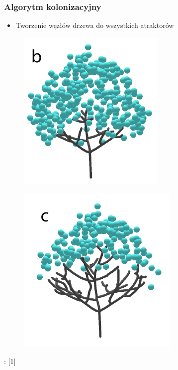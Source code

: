 \documentclass[blue,table]{beamer}
\begin{document}
\begin{frame}\frametitle{Algorytm kolonizacyjny}
\begin{itemize}
\item{Tworzenie węzłów drzewa do wszystkich atraktorów}
\end{itemize}
\begin{multicols}{2}
\begin{figure}
\includegraphics[scale=0.5]{img/colonization_2.png} 
\end{figure}
\begin{figure}
\includegraphics[scale=0.5]{img/colonization_3.png} 
\end{figure}
\end{multicols}
\begin{footnotesize}
: [1]
\end{footnotesize}
\end{frame}
\end{document}
